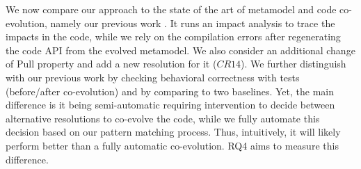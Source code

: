 We now compare our approach to the state of the art of metamodel and code co-evolution, namely our previous work \cite{Khelladi2020}. It runs an impact analysis to trace the impacts in the code, while we rely on the compilation errors after regenerating the code API from the evolved metamodel. 
We also consider an additional change of Pull property and add a new resolution for it ($CR14$). 
We further distinguish with our previous work by checking behavioral correctness with tests (before/after co-evolution) and by comparing to two baselines. 
Yet, the main difference is it being semi-automatic requiring intervention to decide between alternative resolutions to co-evolve the code, while we fully automate this decision based on our pattern matching process. Thus, intuitively, it will likely perform better than a fully automatic co-evolution. RQ4 aims to measure this difference.  

